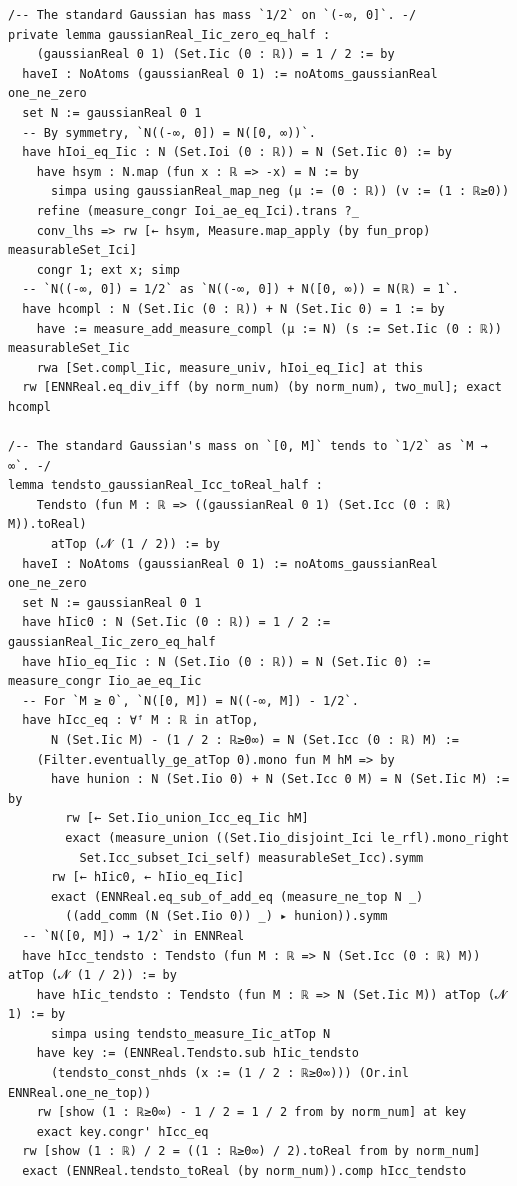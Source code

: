 \newpage
\begin{lstlisting}
/-- The standard Gaussian has mass `1/2` on `(-∞, 0]`. -/
private lemma gaussianReal_Iic_zero_eq_half :
    (gaussianReal 0 1) (Set.Iic (0 : ℝ)) = 1 / 2 := by
  haveI : NoAtoms (gaussianReal 0 1) := noAtoms_gaussianReal one_ne_zero
  set N := gaussianReal 0 1
  -- By symmetry, `N((-∞, 0]) = N([0, ∞))`.
  have hIoi_eq_Iic : N (Set.Ioi (0 : ℝ)) = N (Set.Iic 0) := by
    have hsym : N.map (fun x : ℝ => -x) = N := by
      simpa using gaussianReal_map_neg (μ := (0 : ℝ)) (v := (1 : ℝ≥0))
    refine (measure_congr Ioi_ae_eq_Ici).trans ?_
    conv_lhs => rw [← hsym, Measure.map_apply (by fun_prop) measurableSet_Ici]
    congr 1; ext x; simp
  -- `N((-∞, 0]) = 1/2` as `N((-∞, 0]) + N([0, ∞)) = N(ℝ) = 1`.
  have hcompl : N (Set.Iic (0 : ℝ)) + N (Set.Iic 0) = 1 := by
    have := measure_add_measure_compl (μ := N) (s := Set.Iic (0 : ℝ)) measurableSet_Iic
    rwa [Set.compl_Iic, measure_univ, hIoi_eq_Iic] at this
  rw [ENNReal.eq_div_iff (by norm_num) (by norm_num), two_mul]; exact hcompl

/-- The standard Gaussian's mass on `[0, M]` tends to `1/2` as `M → ∞`. -/
lemma tendsto_gaussianReal_Icc_toReal_half :
    Tendsto (fun M : ℝ => ((gaussianReal 0 1) (Set.Icc (0 : ℝ) M)).toReal)
      atTop (𝓝 (1 / 2)) := by
  haveI : NoAtoms (gaussianReal 0 1) := noAtoms_gaussianReal one_ne_zero
  set N := gaussianReal 0 1
  have hIic0 : N (Set.Iic (0 : ℝ)) = 1 / 2 := gaussianReal_Iic_zero_eq_half
  have hIio_eq_Iic : N (Set.Iio (0 : ℝ)) = N (Set.Iic 0) := measure_congr Iio_ae_eq_Iic
  -- For `M ≥ 0`, `N([0, M]) = N((-∞, M]) - 1/2`.
  have hIcc_eq : ∀ᶠ M : ℝ in atTop,
      N (Set.Iic M) - (1 / 2 : ℝ≥0∞) = N (Set.Icc (0 : ℝ) M) :=
    (Filter.eventually_ge_atTop 0).mono fun M hM => by
      have hunion : N (Set.Iio 0) + N (Set.Icc 0 M) = N (Set.Iic M) := by
        rw [← Set.Iio_union_Icc_eq_Iic hM]
        exact (measure_union ((Set.Iio_disjoint_Ici le_rfl).mono_right
          Set.Icc_subset_Ici_self) measurableSet_Icc).symm
      rw [← hIic0, ← hIio_eq_Iic]
      exact (ENNReal.eq_sub_of_add_eq (measure_ne_top N _)
        ((add_comm (N (Set.Iio 0)) _) ▸ hunion)).symm
  -- `N([0, M]) → 1/2` in ENNReal
  have hIcc_tendsto : Tendsto (fun M : ℝ => N (Set.Icc (0 : ℝ) M)) atTop (𝓝 (1 / 2)) := by
    have hIic_tendsto : Tendsto (fun M : ℝ => N (Set.Iic M)) atTop (𝓝 1) := by
      simpa using tendsto_measure_Iic_atTop N
    have key := (ENNReal.Tendsto.sub hIic_tendsto
      (tendsto_const_nhds (x := (1 / 2 : ℝ≥0∞))) (Or.inl ENNReal.one_ne_top))
    rw [show (1 : ℝ≥0∞) - 1 / 2 = 1 / 2 from by norm_num] at key
    exact key.congr' hIcc_eq
  rw [show (1 : ℝ) / 2 = ((1 : ℝ≥0∞) / 2).toReal from by norm_num]
  exact (ENNReal.tendsto_toReal (by norm_num)).comp hIcc_tendsto

\end{lstlisting}
